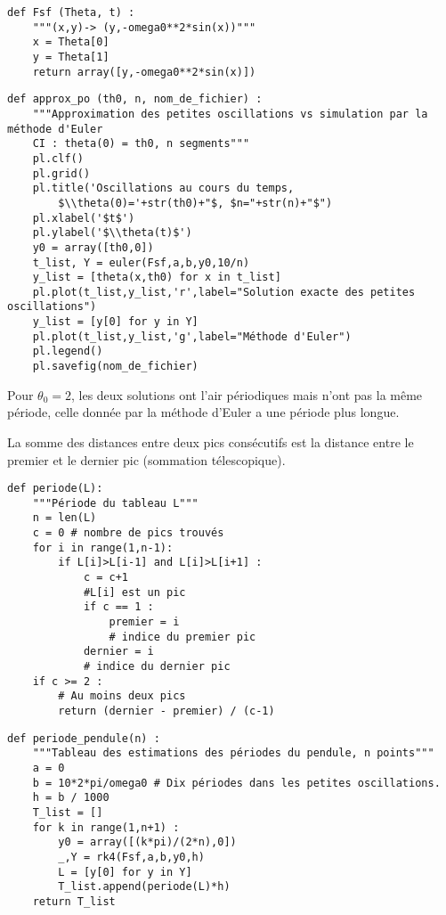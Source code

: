 \question{}
\begin{lstlisting}
def Fsf (Theta, t) :
    """(x,y)-> (y,-omega0**2*sin(x))"""
    x = Theta[0]
    y = Theta[1]
    return array([y,-omega0**2*sin(x)])
\end{lstlisting}

\question{}
\begin{lstlisting}
def approx_po (th0, n, nom_de_fichier) :
    """Approximation des petites oscillations vs simulation par la méthode d'Euler
    CI : theta(0) = th0, n segments"""    
    pl.clf()
    pl.grid()
    pl.title('Oscillations au cours du temps, 
        $\\theta(0)='+str(th0)+"$, $n="+str(n)+"$")
    pl.xlabel('$t$')
    pl.ylabel('$\\theta(t)$')
    y0 = array([th0,0])
    t_list, Y = euler(Fsf,a,b,y0,10/n)
    y_list = [theta(x,th0) for x in t_list]
    pl.plot(t_list,y_list,'r',label="Solution exacte des petites oscillations")
    y_list = [y[0] for y in Y]
    pl.plot(t_list,y_list,'g',label="Méthode d'Euler")
    pl.legend()
    pl.savefig(nom_de_fichier)   
\end{lstlisting}
Pour $\theta_0 = 2$, les deux solutions ont l'air périodiques mais n'ont pas la même période, celle donnée par la méthode d'Euler a une période plus longue.

\question{}
La somme des distances entre deux pics consécutifs est la distance entre le premier et le dernier pic (sommation télescopique).
\begin{lstlisting}
def periode(L):
    """Période du tableau L"""
    n = len(L)
    c = 0 # nombre de pics trouvés
    for i in range(1,n-1):
        if L[i]>L[i-1] and L[i]>L[i+1] :
            c = c+1
            #L[i] est un pic
            if c == 1 :
                premier = i
                # indice du premier pic
            dernier = i
            # indice du dernier pic
    if c >= 2 :
        # Au moins deux pics
        return (dernier - premier) / (c-1)
\end{lstlisting}

\question{}
\begin{lstlisting}
def periode_pendule(n) :
    """Tableau des estimations des périodes du pendule, n points"""
    a = 0
    b = 10*2*pi/omega0 # Dix périodes dans les petites oscillations.
    h = b / 1000
    T_list = []
    for k in range(1,n+1) :
        y0 = array([(k*pi)/(2*n),0])
        _,Y = rk4(Fsf,a,b,y0,h)
        L = [y[0] for y in Y]
        T_list.append(periode(L)*h)
    return T_list
\end{lstlisting}

